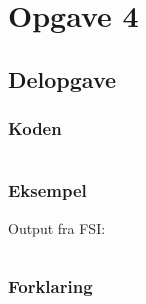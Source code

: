 \section{Opgave 4}
\subsection{Delopgave }\label{ass:1-}
\subsubsection{Koden}
\begin{lstlisting}[language=fsharp]

\end{lstlisting}

\subsubsection{Eksempel}
Output fra FSI:
\begin{lstlisting}

\end{lstlisting}

\subsubsection{Forklaring}


